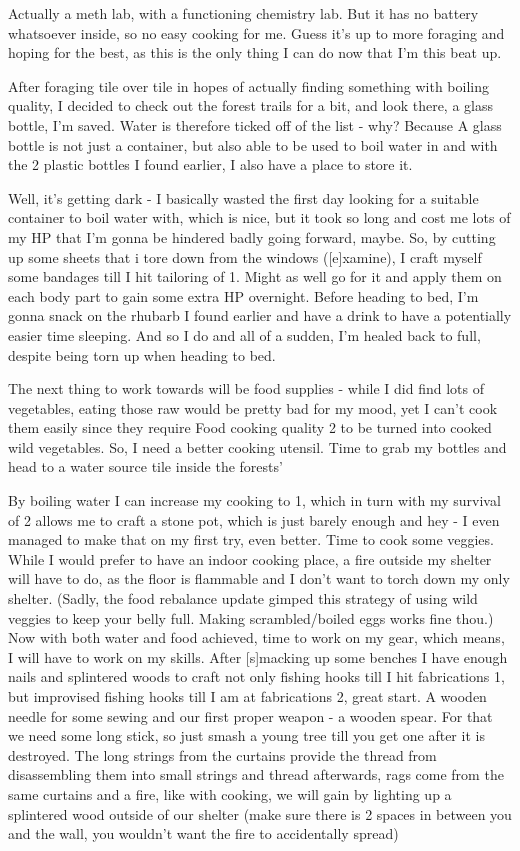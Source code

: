 \documentclass[11pt]{report}
\begin{document}
Actually a meth lab, with a functioning chemistry lab. But it has no battery whatsoever inside, so no easy cooking for me. Guess it's up to more foraging and hoping for the best, as this is the only thing I can do now that I'm this beat up.

After foraging tile over tile in hopes of actually finding something with boiling quality, I decided to check out the forest trails for a bit, and look there, a glass bottle, I'm saved. Water is therefore ticked off of the list - why? Because A glass bottle is not just a container, but also able to be used to boil water in and with the 2 plastic bottles I found earlier, I also have a place to store it.

Well, it's getting dark - I basically wasted the first day looking for a suitable container to boil water with, which is nice, but it took so long and cost me lots of my HP that I'm gonna be hindered badly going forward, maybe. So, by cutting up some sheets that i tore down from the windows ([e]xamine), I craft myself some bandages till I hit tailoring of 1. Might as well go for it and apply them on each body part to gain some extra HP overnight. Before heading to bed, I'm gonna snack on the rhubarb I found earlier and have a drink to have a potentially easier time sleeping. And so I do and all of a sudden, I'm healed back to full, despite being torn up when heading to bed.

The next thing to work towards will be food supplies - while I did find lots of vegetables, eating those raw would be pretty bad for my mood, yet I can't cook them easily since they require Food cooking quality 2 to be turned into cooked wild vegetables. So, I need a better cooking utensil. Time to grab my bottles and head to a water source tile inside the forests'

By boiling water I can increase my cooking to 1, which in turn with my survival of 2 allows me to craft a stone pot, which is just barely enough and hey - I even managed to make that on my first try, even better. Time to cook some veggies. While I would prefer to have an indoor cooking place, a fire outside my shelter will have to do, as the floor is flammable and I don't want to torch down my only shelter.
(Sadly, the food rebalance update gimped this strategy of using wild veggies to keep your belly full. Making scrambled/boiled eggs works fine thou.)
Now with both water and food achieved, time to work on my gear, which means, I will have to work on my skills. After [s]macking up some benches I have enough nails and splintered woods to craft not only fishing hooks till I hit fabrications 1, but improvised fishing hooks till I am at fabrications 2, great start. A wooden needle for some sewing and our first proper weapon - a wooden spear. For that we need some long stick, so just smash a young tree till you get one after it is destroyed. The long strings from the curtains provide the thread from disassembling them into small strings and thread afterwards, rags come from the same curtains and a fire, like with cooking, we will gain by lighting up a splintered wood outside of our shelter (make sure there is 2 spaces in between you and the wall, you wouldn't want the fire to accidentally spread)
\end{document}
